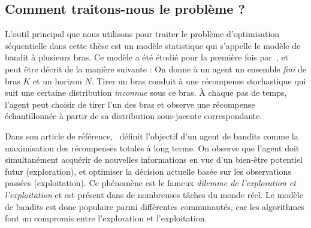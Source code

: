 
\subsection{Comment traitons-nous le probl\`eme ?}\label{sec:abs.context.how}

L'outil principal que nous utilisons pour traiter le problème d'optimisation séquentielle dans cette thèse est un modèle statistique qui s'appelle le modèle de bandit à plusieurs bras. Ce modèle a été étudié pour la première fois par~\cite{thompson1933}, et peut être décrit de la manière suivante : On donne à un agent un ensemble \emph{fini} de bras $K$ et un horizon $N$. Tirer un bras conduit à une récompense stochastique qui suit une certaine distribution \emph{inconnue} sous ce bras. À chaque pas de temps, l'agent peut choisir de tirer l'un des bras et observe une récompense échantillonnée à partir de sa distribution sous-jacente correspondante.


Dans son article de référence,~\cite{robbins1952} définit l'objectif d'un agent de bandits comme la maximisation des récompenses totales à long terme. On observe que l'agent doit simultanément acquérir de nouvelles informations en vue d'un bien-être potentiel futur (exploration), et optimiser la décision actuelle basée sur les observations passées (exploitation). Ce phénomène est le fameux \emph{dilemme de l'exploration et l'exploitation} et est présent dans de nombreuses tâches du monde réel. Le modèle de bandits est donc populaire parmi différentes communautés, car les algorithmes font un compromis entre l'exploration et l'exploitation.

